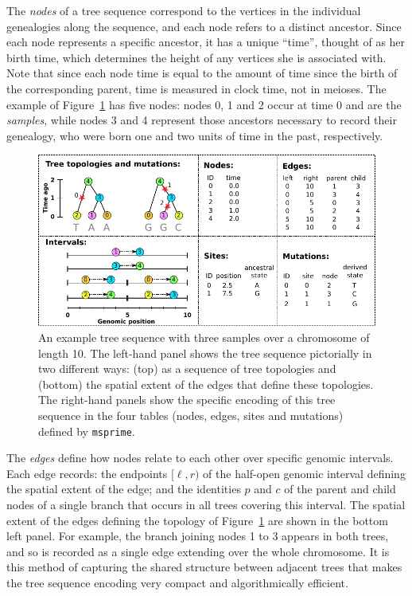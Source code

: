 \documentclass{article}
\newcommand{\msprime}{\texttt{msprime}}
\begin{document}
The \emph{nodes} of a tree sequence
correspond to the vertices in the individual genealogies along the sequence,
and each node refers to a distinct ancestor.
Since each node represents a specific ancestor, it has a unique ``time'',
thought of as her birth time, which determines the height of any vertices
she is associated with.
Note that since each node time is equal to the amount of time since the {birth} of the
corresponding parent, time is measured in clock time, not in meioses.
The example of Figure~\ref{fig:example_tree_sequence} has five nodes:
nodes 0, 1 and 2 occur at time 0 and are the \emph{samples},
while nodes 3 and 4 represent those ancestors necessary to record their genealogy,
who were born one and two units of time in the past, respectively.

\begin{figure}
    \begin{center}
        \includegraphics[width=\textwidth]{example_tree_sequence}
    \end{center}
    \caption{
        An example tree sequence with three samples over a chromosome of length 10.
        The left-hand panel shows the tree sequence pictorially in two different ways:
        (top) as a sequence of tree topologies
        and (bottom) the spatial extent of the edges that define these topologies.
        The right-hand panels show the specific encoding
        of this tree sequence in the four tables (nodes, edges, sites and mutations)
        defined by \msprime.
        \label{fig:example_tree_sequence}
    }
\end{figure}

The \emph{edges} define how nodes relate to each other over specific genomic intervals.
Each edge records:
the endpoints $[\ell, r)$ of the half-open genomic interval defining the
spatial extent of the edge;
and the identities $p$ and $c$ of the parent and child nodes
of a single branch that occurs in all trees covering this interval.
The spatial extent of the edges defining the topology of Figure~\ref{fig:example_tree_sequence}
are shown in the bottom left panel.
For example, the branch joining nodes 1 to 3 appears in both trees,
and so is recorded as a single edge extending over the whole chromosome.
It is this method of capturing the shared structure between adjacent trees that makes the
tree sequence encoding very compact and algorithmically efficient.
\end{document}
